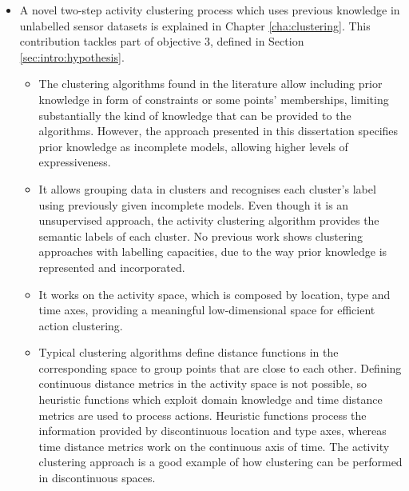 \begin{itemize}
 \item A novel two-step activity clustering process which uses previous knowledge in unlabelled sensor datasets is explained in Chapter \ref{cha:clustering}. This contribution tackles part of objective 3, defined in Section \ref{sec:intro:hypothesis}. %
 \begin{itemize}
  \item The clustering algorithms found in the literature allow including prior knowledge in form of constraints or some points' memberships, limiting substantially the kind of knowledge that can be provided to the algorithms. However, the approach presented in this dissertation specifies prior knowledge as incomplete models, allowing higher levels of expressiveness.
  \item It allows grouping data in clusters and recognises each cluster's label using previously given incomplete models. Even though it is an unsupervised approach, the activity clustering algorithm provides the semantic labels of each cluster. No previous work shows clustering approaches with labelling capacities, due to the way prior knowledge is represented and incorporated.
  \item It works on the activity space, which is composed by location, type and time axes, providing a meaningful low-dimensional space for efficient action clustering.
  \item Typical clustering algorithms define distance functions in the corresponding space to group points that are close to each other. Defining continuous distance metrics in the activity space is not possible, so heuristic functions which exploit domain knowledge and time distance metrics are used to process actions. Heuristic functions process the information provided by discontinuous location and type axes, whereas time distance metrics work on the continuous axis of time. The activity clustering approach is a good example of how clustering can be performed in discontinuous spaces.
 \end{itemize}


\end{itemize}
